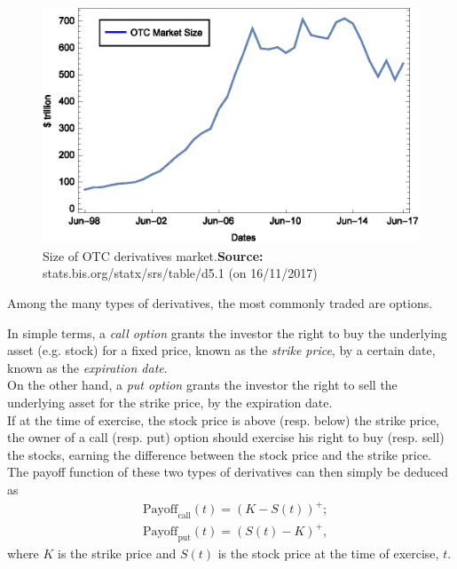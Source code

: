 \documentclass[a4paper,prd,twocolumn,nofootinbib,superscriptaddress,floatfix]{revtex4}
\begin{document}
\begin{figure}[H]
    \centering
      \includegraphics[width=1.0\columnwidth]{OTC.eps}
      \caption{Size of OTC derivatives market.\newline \footnotesize{\textbf{Source:} stats.bis.org/statx/srs/table/d5.1 (on 16/11/2017)}}\label{fig:OTC}
    \end{figure}


Among the many types of derivatives, the most commonly traded are options.

In simple terms, a \textit{call option} grants the investor the right to buy the underlying asset (e.g. stock) for a fixed price, known as the \textit{strike price}, by a certain date, known as the \textit{expiration date}.\\
On the other hand, a \textit{put option} grants the investor the right to sell the underlying asset for the strike price, by the expiration date.\\
If at the time of exercise, the stock price is above (resp. below) the strike price, the owner of a call (resp. put) option should exercise his right to buy (resp. sell) the stocks, earning the difference between the stock price and the strike price. The payoff function of these two types of derivatives can then simply be deduced as
\begin{equation}\label{callput}
\begin{split}
&\text{Payoff}_\text{call}(t)=(K-S(t))^+;\\
&\text{Payoff}_\text{put}(t)=(S(t)-K)^+,
\end{split}
\end{equation}
\noindent where $K$ is the strike price and $S(t)$ is the stock price at the time of exercise, $t$.
\end{document}
